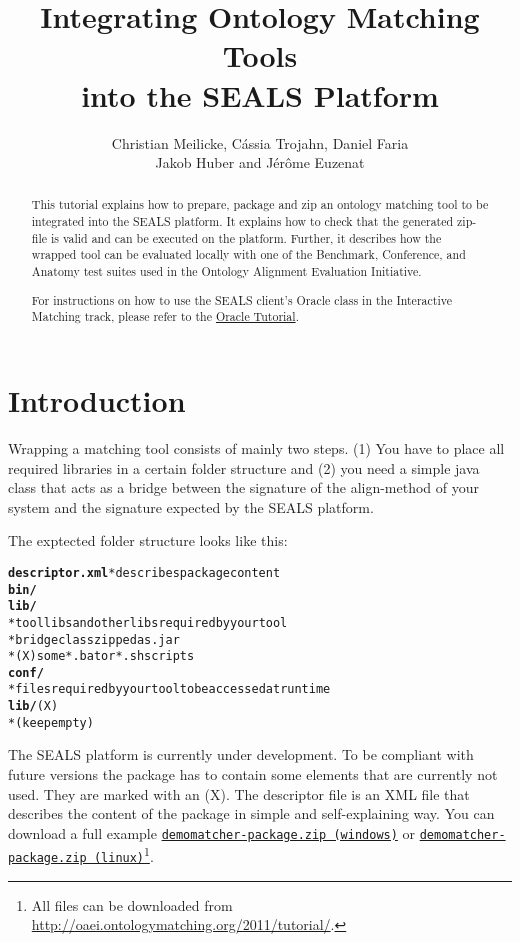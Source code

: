 \documentclass{article}
\begin{document}
\title{Integrating Ontology Matching Tools \\ into the SEALS Platform}

\author{Christian Meilicke, C\'assia Trojahn, Daniel Faria \\ Jakob Huber and J\'er\^ome Euzenat}

\maketitle

\begin{abstract}
This tutorial explains how to prepare, package and zip an ontology matching tool to be integrated into the SEALS platform. It explains how to check that the generated zip-file is valid and can be executed on the platform. Further, it describes how the wrapped tool can be evaluated locally with one of the Benchmark, Conference, and Anatomy test suites used in the Ontology Alignment Evaluation Initiative.

For instructions on how to use the SEALS client's Oracle class in the Interactive Matching track, please refer to the \href{https://github.com/DanFaria/OAEI_SealsClient/blob/master/OracleTutorial.pdf}{Oracle Tutorial}.
\end{abstract}


\section{Introduction}
\label{sec:intro}

Wrapping a matching tool consists of mainly two steps. (1) You have to place all required libraries in a certain folder structure and (2) you need a simple java class that acts as a bridge between the signature of the align-method of your system and the signature expected by the SEALS platform.

The exptected folder structure looks like this:

\begin{alltt}
\textbf{descriptor.xml}  * describes package content 
\textbf{bin/}
   \textbf{lib/}  
        * tool libs and other libs required by your tool
        * bridge class zipped as .jar
        * (X) some *.bat or *.sh scripts
\textbf{conf/}
        * files required by your tool to be accessed at runtime
\textbf{lib/} (X)
        * (keep empty)
\end{alltt}

The SEALS platform is currently under development. To be compliant with future versions the package has to contain some elements that are currently not used. They are marked with an (X). The descriptor file is an XML file that describes the content of the package in simple and self-explaining way. You can download a full example \href{http://oaei.ontologymatching.org/2011/tutorial/windows/demomatcher-package.zip}{\nolinkurl{demomatcher-package.zip (windows)}} or \href{http://oaei.ontologymatching.org/2011/tutorial/linux/demomatcher-package.zip}{\nolinkurl{demomatcher-package.zip (linux)}}\footnote{All files can be downloaded from \url{http://oaei.ontologymatching.org/2011/tutorial/}.}.
\end{document}
